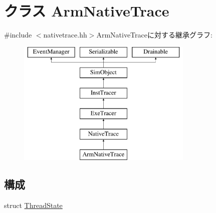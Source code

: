 \hypertarget{classTrace_1_1ArmNativeTrace}{
\section{クラス ArmNativeTrace}
\label{classTrace_1_1ArmNativeTrace}
}


{\ttfamily \#include $<$nativetrace.hh$>$}ArmNativeTraceに対する継承グラフ:\begin{figure}[H]
\begin{center}
\leavevmode
\includegraphics[height=6cm]{classTrace_1_1ArmNativeTrace}
\end{center}
\end{figure}
\subsection*{構成}
\begin{DoxyCompactItemize}
\item 
struct \hyperlink{structTrace_1_1ArmNativeTrace_1_1ThreadState}{ThreadState}
\end{DoxyCompactItemize}
